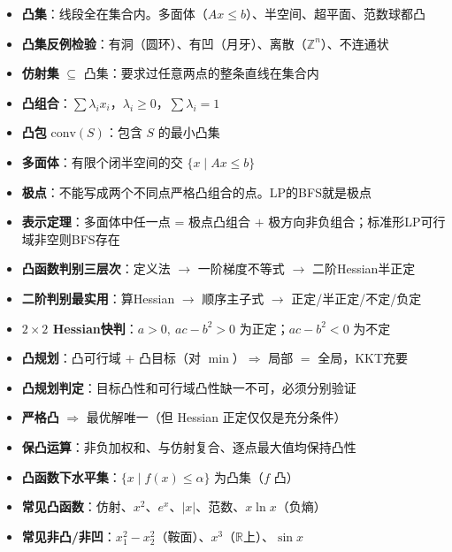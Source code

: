 \begin{itemize}
  \item \textbf{凸集}：线段全在集合内。多面体（$Ax\le b$）、半空间、超平面、范数球都凸
  \item \textbf{凸集反例检验}：有洞（圆环）、有凹（月牙）、离散（$\mathbb{Z}^n$）、不连通状
  \item \textbf{仿射集} $\subseteq$ 凸集：要求过任意两点的整条直线在集合内
  \item \textbf{凸组合}：$\sum\lambda_i x_i$，$\lambda_i\ge0$，$\sum\lambda_i=1$
  \item \textbf{凸包} $\text{conv}(S)$：包含 $S$ 的最小凸集
  \item \textbf{多面体}：有限个闭半空间的交 $\{x\mid Ax\le b\}$
  \item \textbf{极点}：不能写成两个不同点严格凸组合的点。LP的BFS就是极点
  \item \textbf{表示定理}：多面体中任一点 = 极点凸组合 $+$ 极方向非负组合；标准形LP可行域非空则BFS存在
  \item \textbf{凸函数判别三层次}：定义法 $\to$ 一阶梯度不等式 $\to$ 二阶Hessian半正定
  \item \textbf{二阶判别最实用}：算Hessian $\to$ 顺序主子式 $\to$ 正定/半正定/不定/负定
  \item \textbf{$2\times2$ Hessian快判}：$a>0,\ ac-b^2>0$ 为正定；$ac-b^2<0$ 为不定
  \item \textbf{凸规划}：凸可行域 $+$ 凸目标（对 $\min$）$\Rightarrow$ 局部 $=$ 全局，KKT充要
  \item \textbf{凸规划判定}：目标凸性和可行域凸性缺一不可，必须分别验证
  \item \textbf{严格凸} $\Rightarrow$ 最优解唯一（但 Hessian 正定仅仅是充分条件）
  \item \textbf{保凸运算}：非负加权和、与仿射复合、逐点最大值均保持凸性
  \item \textbf{凸函数下水平集}：$\{x\mid f(x)\le\alpha\}$ 为凸集（$f$ 凸）
  \item \textbf{常见凸函数}：仿射、$x^2$、$e^x$、$|x|$、范数、$x\ln x$（负熵）
  \item \textbf{常见非凸/非凹}：$x_1^2-x_2^2$（鞍面）、$x^3$（$\mathbb{R}$上）、$\sin x$
\end{itemize}
